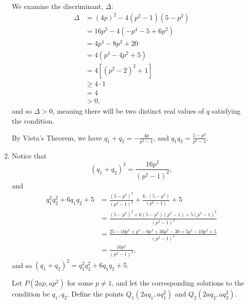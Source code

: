 \begin{enumerate}
          We examine the discriminant, \(\Delta\):
          \begin{align*}
              \Delta & = (4p)^2 - 4 \left(p^2 - 1\right) \left(5 - p^2\right) \\
                     & = 16p^2 - 4\left(-p^4 - 5 + 6p^2\right)                \\
                     & = 4p^4 - 8p^2 + 20                                     \\
                     & = 4 \left(p^4 - 4p^2 + 5\right)                        \\
                     & = 4 \left[\left(p^2 - 2\right)^2 + 1\right]            \\
                     & \geq 4 \cdot 1                                         \\
                     & = 4                                                    \\
                     & > 0,
          \end{align*}
          and so \(\Delta > 0\), meaning there will be two distinct real values of \(q\) satisfying the condition.

          By Vieta's Theorem, we have \(q_1 + q_2 = - \frac{4p}{p^2 - 1}\), and \(q_1 q_2 = \frac{5 - p^2}{p^2 - 1}\).

    \item Notice that
          \[
              \left(q_1 + q_2\right)^2 = \frac{16p^2}{\left(p^2 - 1\right)^2},
          \]
          and
          \begin{align*}
              q_1^2 q_2^2 + 6 q_1 q_2 + 5 & = \frac{\left(5 - p^2\right)^2}{\left(p^2 - 1\right)^2} + \frac{6 \cdot \left(5 - p^2\right)}{\left(p^2 - 1\right)} + 5          \\
                                          & = \frac{\left(5 - p^2\right)^2 + 6 \left(5 - p^2\right) \left(p^2 - 1\right) + 5 \left(p^2 - 1\right)^2}{\left(p^2 - 1\right)^2} \\
                                          & = \frac{25 - 10p^2 + p^4 - 6p^4 + 36 p^2 - 30 + 5p^4 - 10p^2 + 5}{\left(p^2 - 1\right)^2}                                        \\
                                          & = \frac{16 p^2}{\left(p^2 - 1\right)^2},
          \end{align*}
          and so \(\left(q_1 + q_2\right)^2 = q_1^2 q_2^2 + 6 q_1 q_2 + 5\).

          Let \(P\left(2ap, ap^2\right)\) for some \(p \neq 1\), and let the corresponding solutions to the condition be \(q_1, q_2\). Define the points \(Q_1 \left(2aq_1, aq_1^2\right)\) and \(Q_2 \left(2aq_2, aq_2^2\right)\).


\end{enumerate}
